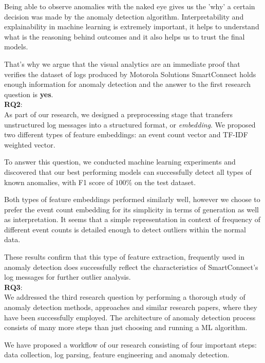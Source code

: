 Being able to observe anomalies with the naked eye gives us the 'why' a certain decision was made by the anomaly detection algorithm. Interpretability and explainability in machine learning is extremely important, it helps to understand what is the reasoning behind outcomes and it also helps us to trust the final models.

That's why we argue that the visual analytics are an immediate proof that verifies the dataset of logs produced by Motorola Solutions SmartConnect holds enough information for anomaly detection and the answer to the first research question is \textbf{yes}. \\

\textbf{RQ2}: \textit{\RQSecond}\\

As part of our research, we designed a preprocessing stage that transfers unstructured log messages into a structured format, or \textit{embedding}. We proposed two different types of feature embeddings: an event count vector and TF-IDF weighted vector.

To answer this question, we conducted machine learning experiments and discovered that our best performing models can successfully detect all types of known anomalies, with F1 score of $100 \%$ on the test dataset.

Both types of feature embeddings performed similarly well, however we choose to prefer the event count embedding for its simplicity in terms of generation as well as interpretation. It seems that a simple representation in context of frequency of different event counts is detailed enough to detect outliers within the normal data. 

These results confirm that this type of feature extraction,  frequently used in anomaly detection does successfully reflect the characteristics of SmartConnect's log messages for further outlier analysis.\\

\textbf{RQ3}: \textit{\RQThird}\\

We addressed the third research question by performing a thorough study of anomaly detection methods, approaches and similar research papers, where they have been successfully employed. The architecture of anomaly detection process consists of many more steps than just choosing and running a ML algorithm. 

We have proposed a workflow of our research consisting of four important steps: data collection, log parsing, feature engineering and anomaly detection.

